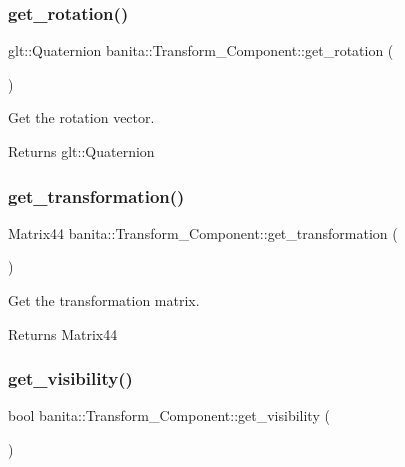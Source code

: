 \subsubsection{\texorpdfstring{get\_rotation()}{get\_rotation()}}
{\footnotesize\ttfamily glt\+::\+Quaternion banita\+::\+Transform\+\_\+\+Component\+::get\+\_\+rotation (\begin{DoxyParamCaption}{ }\end{DoxyParamCaption})\hspace{0.3cm}{\ttfamily [inline]}}



Get the rotation vector. 

\begin{DoxyReturn}{Returns}
glt\+::\+Quaternion 
\end{DoxyReturn}
\mbox{\label{classbanita_1_1_transform___component_a9b955e7fd44d256dd862f61502ab9ec1}} 
\subsubsection{\texorpdfstring{get\_transformation()}{get\_transformation()}}
{\footnotesize\ttfamily Matrix44 banita\+::\+Transform\+\_\+\+Component\+::get\+\_\+transformation (\begin{DoxyParamCaption}{ }\end{DoxyParamCaption})\hspace{0.3cm}{\ttfamily [inline]}}



Get the transformation matrix. 

\begin{DoxyReturn}{Returns}
Matrix44 
\end{DoxyReturn}
\mbox{\label{classbanita_1_1_transform___component_acd8c38c25e9ca8aa7f527605907bca7b}} 
\subsubsection{\texorpdfstring{get\_visibility()}{get\_visibility()}}
{\footnotesize\ttfamily bool banita\+::\+Transform\+\_\+\+Component\+::get\+\_\+visibility (\begin{DoxyParamCaption}{ }\end{DoxyParamCaption})\hspace{0.3cm}{\ttfamily [inline]}}



